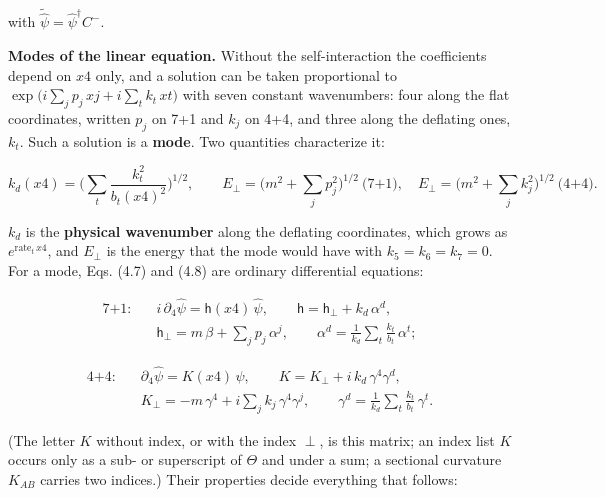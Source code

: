 \documentclass[
  10pt,
]{article}
\begin{document}
with \(\tilde{\hat\psi}=\hat\psi^\dagger C^-\).

\textbf{Modes of the linear equation.} Without the self-interaction the
coefficients depend on \(x4\) only, and a solution can be taken
proportional to \(\exp\big(i\sum_jp_j\,xj+i\sum_tk_t\,xt\big)\) with
seven constant wavenumbers: four along the flat coordinates, written
\(p_j\) on 7+1 and \(k_j\) on 4+4, and three along the deflating ones,
\(k_t\). Such a solution is a \textbf{mode}. Two quantities characterize
it:

\[k_d(x4)=\Big(\sum_t\frac{k_t^2}{b_t(x4)^2}\Big)^{1/2},\qquad
E_\perp=\Big(m^2+\sum_jp_j^2\Big)^{1/2}\ \text{(7+1)},\quad
E_\perp=\Big(m^2+\sum_jk_j^2\Big)^{1/2}\ \text{(4+4)}.\tag{4.9}\]

\(k_d\) is the \textbf{physical wavenumber} along the deflating
coordinates, which grows as \(e^{\mathrm{rate}_t\,x4}\), and \(E_\perp\)
is the energy that the mode would have with \(k_5=k_6=k_7=0\). For a
mode, Eqs. (4.7) and (4.8) are ordinary differential equations:

\[\begin{aligned}
\text{7+1:}\quad&i\,\partial_4\hat\psi=\mathsf h(x4)\,\hat\psi,\qquad\mathsf h=\mathsf h_\perp+k_d\,\alpha^d,\\
&\mathsf h_\perp=m\,\beta+\sum_jp_j\,\alpha^j,\qquad
\alpha^d=\frac1{k_d}\sum_t\frac{k_t}{b_t}\,\alpha^t;
\end{aligned}\tag{4.10}\]

\[\begin{aligned}
\text{4+4:}\quad&\partial_4\hat\psi=K(x4)\,\hat\psi,\qquad K=K_\perp+i\,k_d\,\gamma^4\gamma^d,\\
&K_\perp=-m\,\gamma^4+i\sum_jk_j\,\gamma^4\gamma^j,\qquad
\gamma^d=\frac1{k_d}\sum_t\frac{k_t}{b_t}\,\gamma^t.
\end{aligned}\tag{4.11}\]

(The letter \(K\) without index, or with the index \(\perp\), is this
matrix; an index list \(K\) occurs only as a sub- or superscript of
\(\Theta\) and under a sum; a sectional curvature \(K_{AB}\) carries two
indices.) Their properties decide everything that follows:
\end{document}
